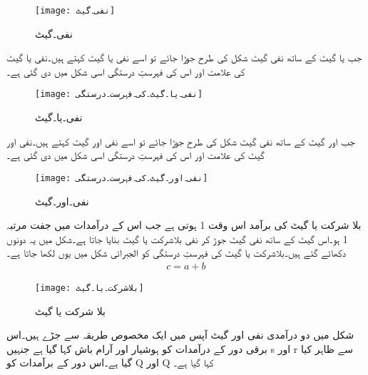 \begin{figure}[th]
 \begin{center}
  \texttt{[image: نفی۔گیٹ]}
 \end{center}
\caption{نفی۔گیٹ}
\label{شکل۔نفی۔گیٹ}
\end{figure}

جب یا گیٹ کے ساتھ نفی گیٹ شکل  کی طرح جوڑا جائے تو اسے نفی یا گیٹ کہتے ہیں۔نفی یا گیٹ کی علامت اور اس کی فہرستِ درستگی اسی شکل میں دی گئی ہے۔

\begin{figure}[th]
 \begin{center}
  \texttt{[image: نفی۔یا۔گیٹ۔کی۔فہرست۔درستگی]}
 \end{center}
\caption{نفی۔یا۔گیٹ}
\label{شکل۔نفی۔یا۔گیٹ۔کی۔فہرست۔درستگی}
\end{figure}
 
جب اور گیٹ کے ساتھ نفی گیٹ شکل  کی طرح جوڑا جائے تو اسے نفی اور گیٹ کہتے ہیں۔نفی اور گیٹ کی علامت اور اس کی فہرستِ درستگی اسی شکل میں دی گئی ہے۔


\begin{figure}[th]
 \begin{center}
  \texttt{[image: نفی۔اور۔گیٹ۔کی۔فہرست۔درستگی]}
 \end{center}
\caption{نفی۔اور۔گیٹ}
\label{شکل۔نفی۔اور۔گیٹ۔کی۔فہرست۔درستگی}
\end{figure}

بلا شرکت یا گیٹ کی برآمد اس وقت 1 ہوتی ہے جب اس کے درآمدات میں جفت مرتبہ 1 ہو۔اس گیٹ کے ساتھ نفی گیٹ جوڑ کر نفی بلاشرکت یا گیٹ بنایا جاتا ہے۔شکل میں یہ دونوں دکھائے گئے ہیں۔بلاشرکت یا گیٹ کی فہرستِ درستگی کو الجبرائی شکل میں یوں لکھا جاتا ہے۔
\begin{align*}
c=a+b
\end{align*}

\begin{figure}[th]
 \begin{center}
  \texttt{[image: بلاشرکت۔یا۔گیٹ]}
 \end{center}
\caption{بلا شرکت یا گیٹ}
\label{شکل۔بلاشرکت۔یا۔گیٹ}
\end{figure}

شکل  میں دو درآمدی نفی اور گیٹ آپس میں ایک مخصوص طریقہ سے جڑے ہیں۔اس برقی دور کے درآمدات کو ہوشیار  اور آرام باش  کہا گیا ہے جنہیں s اور r سے ظاہر کیا گیا ہے۔اس دور کے برآمدات کو Q اور Q کہا گیا ہے۔

